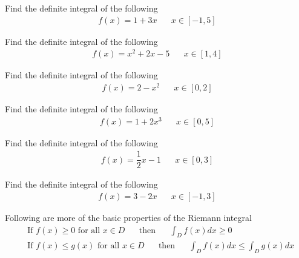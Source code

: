 \begin{exercise}
Find the definite integral of the following
\begin{align*}
    f(x) = 1 + 3x \hspace{20pt} x \in [-1, 5]
\end{align*}
\end{exercise}

\begin{exercise}
Find the definite integral of the following
\begin{align*}
    f(x) = x^{2} + 2x - 5 \hspace{20pt} x \in [1, 4]
\end{align*}
\end{exercise}

\begin{exercise}
Find the definite integral of the following
\begin{align*}
    f(x) = 2 - x^{2} \hspace{20pt} x \in [0, 2]
\end{align*}
\end{exercise}

\begin{exercise}
Find the definite integral of the following
\begin{align*}
    f(x) = 1 + 2x^{3} \hspace{20pt} x \in [0, 5]
\end{align*}
\end{exercise}

\begin{exercise}
Find the definite integral of the following
\begin{align*}
    f(x) = \dfrac{1}{2}x - 1 \hspace{20pt} x \in [0, 3]
\end{align*}
\end{exercise}

\begin{exercise}
Find the definite integral of the following
\begin{align*}
    f(x) = 3 - 2x \hspace{20pt} x \in [-1, 3]
\end{align*}
\end{exercise}

\begin{theorem}
Following are more of the basic properties of the Riemann integral
\begin{align*}
    &\text{If} \hspace{4pt} f(x) \geq 0 \hspace{4pt} \text{for all $x \in D$} \hspace{20pt} \text{then} \hspace{20pt} \int_{D} f(x) dx \geq 0\\[2ex]
    &\text{If} \hspace{4pt} f(x) \leq g(x) \hspace{4pt} \text{for all $x \in D$} \hspace{20pt} \text{then} \hspace{20pt} \int_{D} f(x) dx \leq \int_{D} g(x) dx 
\end{align*}
\end{theorem}

